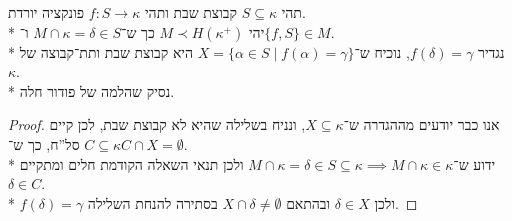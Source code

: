 \question{}
תהי $S \subseteq \kappa$ קבוצת שבת ותהי $f : S \to \kappa$ פונקציה יורדת. \\*
יהי $M \prec H(\kappa^+)$ כך ש־$M \cap \kappa = \delta \in S$ ו־$\{f, S\} \in M$. \\*
נגדיר $f(\delta) = \gamma$, נוכיח ש־$X = \{ \alpha \in S \mid f(\alpha) = \gamma \}$ היא קבוצת שבת ותת־קבוצה של $\kappa$. \\*
נסיק שהלמה של פודור חלה.
\begin{proof}
	אנו כבר יודעים מההגדרה ש־$X \subseteq \kappa$, ונניח בשלילה שהיא לא קבוצת שבת, לכן קיים $C \subseteq \kappa$ סל''ח, כך ש־$C \cap X = \emptyset$. \\*
	ידוע ש־$M \cap \kappa = \delta \in S \subseteq \kappa \implies M \cap \kappa \in \kappa$ ולכן תנאי השאלה הקודמת חלים ומתקיים $\delta \in C$. \\*
	$f(\delta) = \gamma$ ולכן $\delta \in X$ ובהתאם $X \cap \delta \ne \emptyset$ בסתירה להנחת השלילה.
\end{proof}



